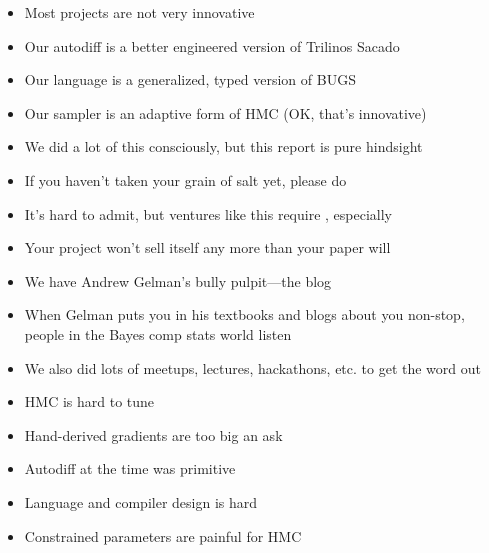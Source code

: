 \documentclass[9pt]{report}
\begin{document}
\begin{itemize}
\item Most projects are not very innovative
\item Our autodiff is a better engineered version of Trilinos Sacado
\item Our language is a generalized, typed version of BUGS
\item Our sampler is an adaptive form of HMC (OK, that's innovative)
\end{itemize}

\begin{itemize}
\item We did a lot of this consciously, but this report is pure hindsight
\item If you haven't taken your grain of salt yet, please do
  \vspace*{12pt}
\item It's hard to admit, but ventures like this require , especially 
\end{itemize}

\begin{itemize}
\item Your project won't sell itself any more than your paper will
\item We have Andrew Gelman's bully pulpit---the blog
\item When Gelman puts you in his textbooks and blogs about you
  non-stop, people in the Bayes comp stats world listen
\item We also did lots of meetups, lectures, hackathons, etc. to get
  the word out
\end{itemize}

\begin{itemize}
\item HMC is hard to tune
\item Hand-derived gradients are too big an ask
\item Autodiff at the time was primitive
\item Language and compiler design is hard
\item Constrained parameters are painful for HMC
\end{itemize}
\end{document}
